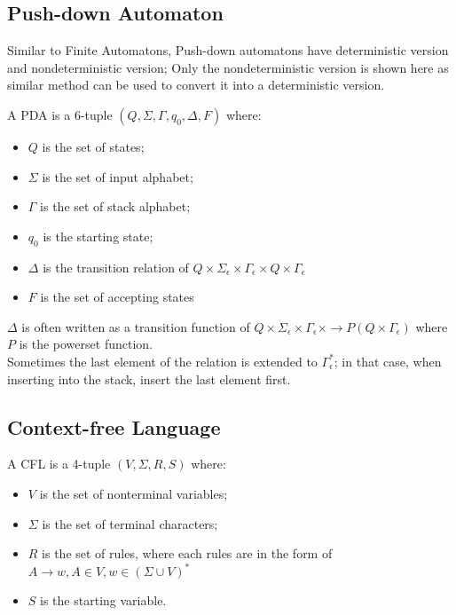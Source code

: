 \documentclass{report}
\begin{document}
		\subsection{Push-down Automaton}
			Similar to Finite Automatons, Push-down automatons have deterministic version and nondeterministic version; Only the nondeterministic version is shown here as similar method can be used to convert it into a deterministic version.
			\begin{defn} \label{def_pda}
				A PDA is a 6-tuple $(Q,\Sigma,\Gamma,q_0,\Delta,F)$ where:
				\begin{itemize}
					\item $Q$ is the set of states;
					\item $\Sigma$ is the set of input alphabet;
					\item $\Gamma$ is the set of stack alphabet;
					\item $q_0$ is the starting state;
					\item $\Delta$ is the transition relation of $Q \times \Sigma_\epsilon \times \Gamma_\epsilon \times Q \times \Gamma_\epsilon$
					\item $F$ is the set of accepting states
				\end{itemize}
				$\Delta$ is often written as a transition function of $Q \times \Sigma_\epsilon \times \Gamma_\epsilon \times \rightarrow P(Q \times \Gamma_\epsilon)$ where $P$ is the powerset function.\\
				Sometimes the last element of the relation is extended to $\Gamma_\epsilon^*$; in that case, when inserting into the stack, insert the last element first.
			\end{defn}
		
		\subsection{Context-free Language}
			\begin{defn} \label{def_cfl}
				A CFL is a 4-tuple $(V,\Sigma,R,S)$ where:
				\begin{itemize}
					\item $V$ is the set of nonterminal variables;
					\item $\Sigma$ is the set of terminal characters;
					\item $R$ is the set of rules, where each rules are in the form of $A\rightarrow w, A\in V, w\in (\Sigma \cup V)^*$
					\item $S$ is the starting variable.
				\end{itemize}
			\end{defn}
		
\end{document}
